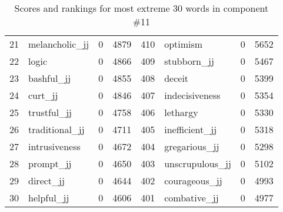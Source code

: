 \begin{table}[tbp]
\begin{tabular}{| rlr@{.}l | rlr@{.}l |}
    21 & melancholic\_jj & 0 & 4879    &    410 & optimism & 0 & 5652 \\
    22 & logic & 0 & 4866    &    409 & stubborn\_jj & 0 & 5467 \\
    23 & bashful\_jj & 0 & 4855    &    408 & deceit & 0 & 5399 \\
    24 & curt\_jj & 0 & 4846    &    407 & indecisiveness & 0 & 5354 \\
    25 & trustful\_jj & 0 & 4758    &    406 & lethargy & 0 & 5330 \\
    26 & traditional\_jj & 0 & 4711    &    405 & inefficient\_jj & 0 & 5318 \\
    27 & intrusiveness & 0 & 4672    &    404 & gregarious\_jj & 0 & 5298 \\
    28 & prompt\_jj & 0 & 4650    &    403 & unscrupulous\_jj & 0 & 5102 \\
    29 & direct\_jj & 0 & 4644    &    402 & courageous\_jj & 0 & 4993 \\
    30 & helpful\_jj & 0 & 4606    &    401 & combative\_jj & 0 & 4977 \\
    \hline
    \end{tabular}
    \caption{Scores and rankings for most extreme 30 words in component \#11} 
\end{table}
\clearpage
